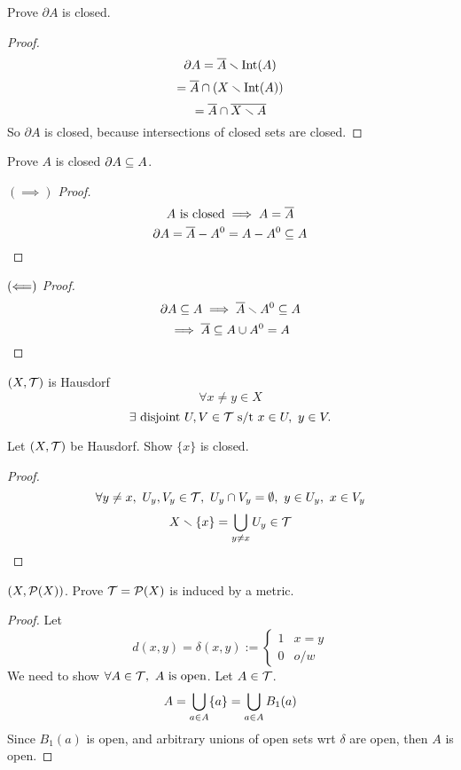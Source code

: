 \documentclass[12pt]{article}
\begin{document}
\bboxexam
\begin{exam}
    Prove \(\partial A\) is closed.
    \bboxproof
    \begin{proof}
        \[
            \partial A=\overline{A}\smallsetminus\mathrm{Int}(A)
        \]
        \[
            =\overline{A}\cap(X\smallsetminus\mathrm{Int}(A))
        \]
        \[
            =\overline{A}\cap\overline{X\smallsetminus A}
        \]
        So \(\partial A\) is closed, because intersections of
        closed sets are closed.
    \end{proof}
    \ebox
\end{exam}
\ebox

\bboxexam
\begin{exam}
    Prove \(A\) is closed  \(\partial A\subseteq A\).
    \bboxproof
    \begin{proof}[\((\implies)\) Proof]
        \[
            A\text{ is closed}\implies A=\overline{A}
        \]
        \[
            \partial A=\overline{A}-A^0=A-A^0\subseteq A
        \]
    \end{proof}
    \ebox

    \bboxproof
    \begin{proof}[\((\Longleftarrow)\) Proof]
        \[
            \partial A\subseteq A\implies\overline{A}\smallsetminus A^0\subseteq A
        \]
        \[
            \implies \overline{A}\subseteq A\cup A^0=A
        \]
    \end{proof}
    \ebox
\end{exam}
\ebox

\bboxdefn
\begin{defn}[Hausdorf]
    \((X,\mathcal T)\) is Hausdorf 
    \[
        \forall x\neq y\in X
    \]
    \[
        \exists\ \mathrm{disjoint}\ U,V\in\mathcal T\text{ s/t } x\in U,\ y\in V.
    \]
\end{defn}
\ebox

\bboxexam
\begin{exam}
    Let \((X,\mathcal T)\) be Hausdorf. Show
    \(\{x\}\) is closed.
    \bboxproof
    \begin{proof}
        
        \[
            \forall y\neq x,\ U_y,V_y\in\TT,\ U_y\intr V_y=\emptyset,\ 
            y\in U_y,\ x\in V_y
        \]
        \[
            X\smallsetminus\{x\}=\bigcup_{y\neq x}U_y\in\mathcal T
        \]
    \end{proof}
    \ebox
\end{exam}
\ebox

\bboxexam
\begin{exam}
    \((X,\mathcal P(X))\). Prove \(\mathcal T=\mathcal P(X)\) is induced by a metric.
    \bboxproof
    \begin{proof}
        Let
        \[
            d(x,y)=\delta(x,y):=\begin{cases} 1 & x=y \\ 0 & o/w \end{cases}
        \]
        We need to show \(\forall A\in\mathcal T,\ A\text{ is open}\). Let \(A\in\mathcal T\).
        \[
            A=\bigcup_{a\in A}\{a\}=\bigcup_{a\in A}B_1(a)
        \]
        Since \(B_1(a)\) is open, and arbitrary unions of open sets wrt
        \(\delta\) are open, then \(A\) is open.
    \end{proof}
    \ebox

\end{exam}
\ebox
\end{document}
